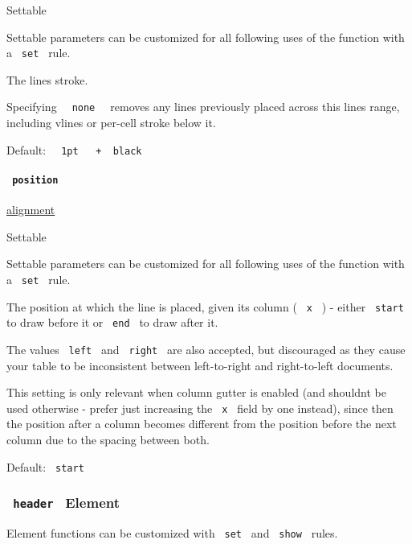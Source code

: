 {{ Settable }}

\label{definitions-vline-stroke-settable-tooltip}
Settable parameters can be customized for all following uses of the
function with a \texttt{\ set\ } rule.

The line\textquotesingle s stroke.

Specifying \texttt{\ }{\texttt{\ none\ }}\texttt{\ } removes any lines
previously placed across this line\textquotesingle s range, including
vlines or per-cell stroke below it.

Default:
\texttt{\ }{\texttt{\ 1pt\ }}\texttt{\ }{\texttt{\ +\ }}\texttt{\ black\ }

\paragraph{\texorpdfstring{\texttt{\ position\ }}{ position }}\label{definitions-vline-position}

\href{/docs/reference/layout/alignment/}{alignment}

{{ Settable }}

\label{definitions-vline-position-settable-tooltip}
Settable parameters can be customized for all following uses of the
function with a \texttt{\ set\ } rule.

The position at which the line is placed, given its column (
\texttt{\ x\ } ) - either \texttt{\ start\ } to draw before it or
\texttt{\ end\ } to draw after it.

The values \texttt{\ left\ } and \texttt{\ right\ } are also accepted,
but discouraged as they cause your table to be inconsistent between
left-to-right and right-to-left documents.

This setting is only relevant when column gutter is enabled (and
shouldn\textquotesingle t be used otherwise - prefer just increasing the
\texttt{\ x\ } field by one instead), since then the position after a
column becomes different from the position before the next column due to
the spacing between both.

Default: \texttt{\ start\ }

\subsubsection{\texorpdfstring{\texttt{\ header\ } {{ Element
}}}{ header   Element }}\label{definitions-header}

\label{definitions-header-element-tooltip}
Element functions can be customized with \texttt{\ set\ } and
\texttt{\ show\ } rules.

